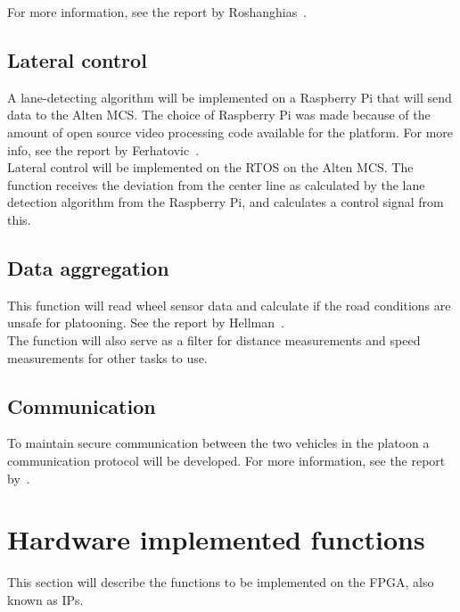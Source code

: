 For more information, see the report by Roshanghias~\cite{roshanghias2017}.

\subsection{Lateral control}
A lane-detecting algorithm will be implemented on a Raspberry Pi that will send data to the Alten MCS. The choice of Raspberry Pi was made because of the amount of open source video processing code available for the platform. For more info, see the report by Ferhatovic~\cite{ferhatovic2017}.\\

Lateral control will be implemented on the RTOS on the Alten MCS. The function receives the deviation from the center line as calculated by the lane detection algorithm from the Raspberry Pi, and calculates a control signal from this.

\subsection{Data aggregation}
This function will read wheel sensor data and calculate if the road conditions are unsafe for platooning. See the report by Hellman~\cite{hellman2017}.\\

The function will also serve as a filter for distance measurements and speed measurements for other tasks to use.

\subsection{Communication}
To maintain secure communication between the two vehicles in the platoon a communication protocol will be developed. For more information, see the report by~\cite{lerander2017}.%


\section{Hardware implemented functions}
This section will describe the functions to be implemented on the FPGA, also known as IPs.

